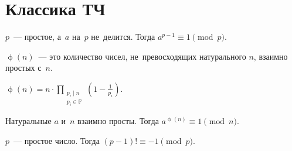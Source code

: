 
\section*{Классика ТЧ}


\begingroup
    \ifdefined\mathup
        \def\eulerphi{\mathup{\phi}}%
    \else
        \def\eulerphi{\upphi}%
    \fi
    \def\divides{\mathrel{\vert}}%

$p$~--- простое, а~$a$ на~$p$ не~делится.
Тогда $a^{p-1} \equiv 1 \pmod{p}$.

$\eulerphi(n)$~--- это количество чисел, не~превосходящих натурального $n$,
взаимно простых с~$n$.

\( \displaystyle
    \eulerphi(n)
=
    n \cdot
    \prod\limits_{\substack{
        p_i \divides n_{\phantom{i}} \\
        p_i \in \mathbb{P}
    }}
        \left( 1 - \frac{1}{p_i} \right)
\).

Натуральные $a$ и~$n$ взаимно просты.
Тогда $a^{\eulerphi(n)} \equiv 1 \pmod{n}$.

$p$~--- простое число.
Тогда $(p - 1)! \equiv -1 \pmod{p}$.

